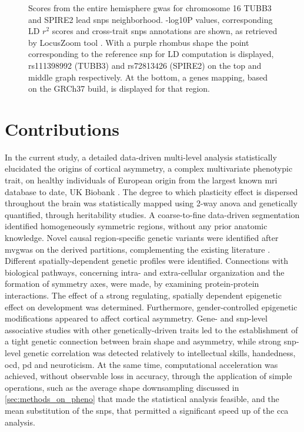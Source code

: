 \begin{figure}[H]
	\begin{adjustwidth}{-3cm}{-2.5cm}
		\centering
		\par\medskip
		\caption[Entire hemisphere \ac{gwas} Manhattan plot chromosome 16 peaks  in detail]{Scores from the entire hemisphere \ac{gwas} for chromosome 16 TUBB3 and SPIRE2 lead \acp{snp} neighborhood. -log10P values, corresponding LD $r^2$ scores and cross-trait \acp{snp} annotations are shown, as retrieved by LocusZoom tool \cite{Boughton2021}. With a purple rhombus shape the point corresponding to the reference \ac{snp} for LD computation is displayed, rs111398992 (TUBB3) and rs72813426 (SPIRE2) on the top and middle graph respectively. At the bottom, a genes mapping, based on the GRCh37 build, is displayed for that region.}
		\label{fig:chr16}
	\end{adjustwidth}
\end{figure}


\section{Contributions}
In the current study, a detailed  data-driven multi-level analysis statistically elucidated the origins of cortical asymmetry, a complex multivariate phenotypic trait, on healthy individuals of European origin from the largest known \ac{mri} database to date, UK Biobank \cite{Littlejohns2020}. The degree to which plasticity effect is dispersed throughout the brain was statistically mapped using 2-way \ac{anova} and genetically quantified, through heritability studies. A coarse-to-fine data-driven segmentation identified homogeneously symmetric regions, without any prior anatomic knowledge.  Novel causal region-specific genetic variants were identified after \ac{mvgwas} on the derived partitions, complementing the existing literature \cite{Sha2021}. Different spatially-dependent genetic profiles were identified. Connections with biological pathways, concerning intra- and extra-cellular organization and the formation of symmetry axes, were made, by examining protein-protein interactions. The effect of a strong regulating, spatially dependent epigenetic effect on development was determined. Furthermore, gender-controlled epigenetic modifications appeared to affect cortical asymmetry. Gene- and \ac{snp}-level associative studies  with other genetically-driven traits led to the establishment of a tight genetic connection between  brain shape and asymmetry, while strong \ac{snp}-level genetic correlation was detected relatively to intellectual skills, handedness, \ac{ocd}, \ac{pd} and neuroticism. At the same time, computational acceleration was achieved, without observable loss in accuracy, through the application of simple operations, such as the average shape downsampling discussed in \autoref{sec:methods_on_pheno} that made the statistical analysis feasible, and the mean substitution of the \acp{snp}, that permitted a significant speed up of the \ac{cca} analysis.

